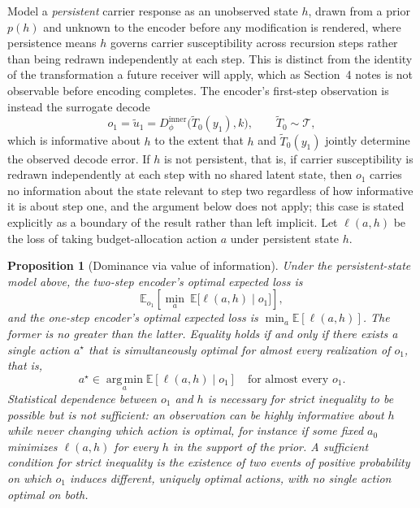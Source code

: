 \documentclass[11pt]{article}
\newtheorem{proposition}{Proposition}
\begin{document}
Model a \emph{persistent} carrier response as an unobserved state $h$, drawn from a prior $p(h)$ and unknown to the encoder before any modification is rendered, where persistence means $h$ governs carrier susceptibility across recursion steps rather than being redrawn independently at each step. This is distinct from the identity of the transformation a future receiver will apply, which as Section~4 notes is not observable before encoding completes. The encoder's first-step observation is instead the surrogate decode
\[
o_1 = \tilde u_1 = D_\phi^{\mathrm{inner}}\bigl(\widetilde T_0(y_1), k\bigr), \qquad \widetilde T_0 \sim \mathcal{T},
\]
which is informative about $h$ to the extent that $h$ and $\widetilde T_0(y_1)$ jointly determine the observed decode error. If $h$ is not persistent, that is, if carrier susceptibility is redrawn independently at each step with no shared latent state, then $o_1$ carries no information about the state relevant to step two regardless of how informative it is about step one, and the argument below does not apply; this case is stated explicitly as a boundary of the result rather than left implicit. Let $\ell(a,h)$ be the loss of taking budget-allocation action $a$ under persistent state $h$.

\begin{proposition}[Dominance via value of information]
\label{prop:recursion}
Under the persistent-state model above, the two-step encoder's optimal expected loss is
\[
\mathbb{E}_{o_1}\!\left[\min_{a}\ \mathbb{E}\bigl[\ell(a,h)\mid o_1\bigr]\right],
\]
and the one-step encoder's optimal expected loss is $\min_a \mathbb{E}[\ell(a,h)]$. The former is no greater than the latter. Equality holds if and only if there exists a single action $a^\star$ that is simultaneously optimal for almost every realization of $o_1$, that is,
\[
a^\star \in \operatorname*{arg\,min}_a \mathbb{E}[\ell(a,h)\mid o_1] \quad \text{for almost every } o_1.
\]
Statistical dependence between $o_1$ and $h$ is necessary for strict inequality to be possible but is not sufficient: an observation can be highly informative about $h$ while never changing which action is optimal, for instance if some fixed $a_0$ minimizes $\ell(a,h)$ for every $h$ in the support of the prior. A sufficient condition for strict inequality is the existence of two events of positive probability on which $o_1$ induces different, uniquely optimal actions, with no single action optimal on both.
\end{proposition}
\end{document}
